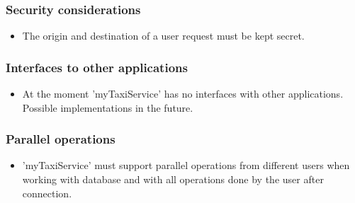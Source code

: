 \subsubsection{Security considerations}
	\begin{itemize}
		\item The origin and destination of a user request must be kept secret.
	\end{itemize}

\subsubsection{Interfaces to other applications}
	\begin{itemize}
		\item At the moment 'myTaxiService' has no interfaces with other applications. Possible implementations in the future.
	\end{itemize}

\subsubsection{Parallel operations}
	\begin{itemize}
		\item 'myTaxiService' must support parallel operations from different users when working with database and with all operations done by the user after connection.
	\end{itemize}